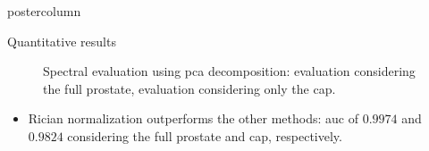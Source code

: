 \documentclass[final, size=a0]{beamer}
\begin{document}
\begin{frame}
\begin{columns}
\begin{column}{.33\textwidth}
\begin{beamercolorbox}[center,wd=\textwidth]{postercolumn}
\begin{minipage}[T]{.95\textwidth}
{            
            \begin{block}{Quantitative results}
              \begin{figure}
                \centering
                \hfill
                \caption{Spectral evaluation using \ac{pca} decomposition: \protect{} evaluation considering the full prostate, \protect{} evaluation considering only the \ac{cap}.}
                \label{fig:qt}
              \end{figure}
              
              \begin{itemize}
                \item Rician normalization outperforms the other methods: \ac{auc} of $0.9974$ and $0.9824$ considering the full prostate and \ac{cap}, respectively.
              \end{itemize}

            \end{block}
            
}
\end{minipage}
\end{beamercolorbox}
\end{column}
\end{columns}
\end{frame}
\end{document}
